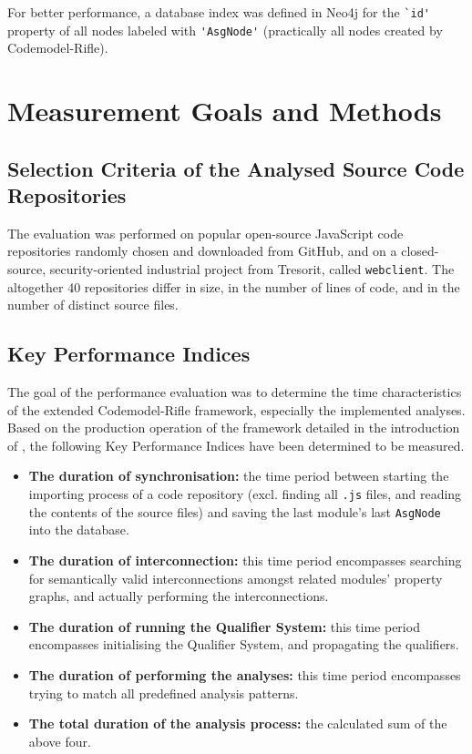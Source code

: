 For better performance, a database index was defined in Neo4j for the \lstinline{`id'} property of all nodes labeled with \lstinline{'AsgNode'} (practically all nodes created by Codemodel-Rifle).


\section{Measurement Goals and Methods}

\subsection{Selection Criteria of the Analysed Source Code Repositories}

The evaluation was performed on popular open-source JavaScript code repositories randomly chosen and downloaded from GitHub, and on a closed-source, security-oriented industrial project from Tresorit, called \lstinline{webclient}. The altogether 40 repositories differ in size, in the number of lines of code, and in the number of distinct source files.


\subsection{Key Performance Indices}

The goal of the performance evaluation was to determine the time characteristics of the extended Codemodel-Rifle framework, especially the implemented analyses. Based on the production operation of the framework detailed in the introduction of , the following Key Performance Indices have been determined to be measured.

\begin{itemize}
\item \textbf{The duration of synchronisation:} the time period between starting the importing process of a code repository (excl. finding all \lstinline{.js} files, and reading the contents of the source files) and saving the last module's last \lstinline{AsgNode} into the database.
\item \textbf{The duration of interconnection:} this time period encompasses searching for semantically valid interconnections amongst related modules' property graphs, and actually performing the interconnections.
\item \textbf{The duration of running the Qualifier System:} this time period encompasses initialising the Qualifier System, and propagating the qualifiers.
\item \textbf{The duration of performing the analyses:} this time period encompasses trying to match all predefined analysis patterns.
\item \textbf{The total duration of the analysis process:} the calculated sum of the above four.
\end{itemize}

